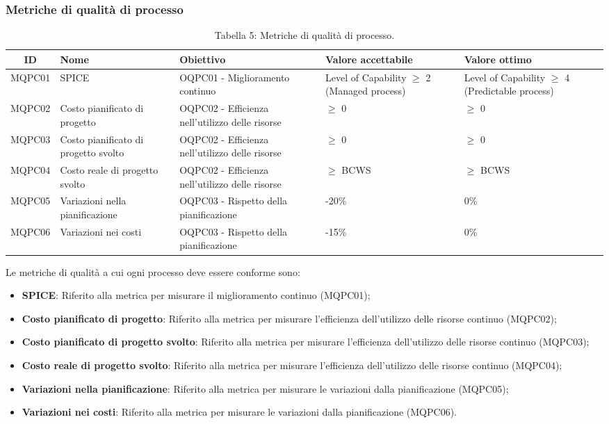 \subsubsection{Metriche di qualità di processo}
\begin{table}[H]
	\centering
	\begin{tabularx}{\textwidth}{|c|X|X|X|X|}
		\hline
		\textbf{ID} & \textbf{Nome} & \textbf{Obiettivo} & \textbf{Valore accettabile} & \textbf{Valore ottimo}\\
		\hline
		MQPC01 & SPICE & OQPC01 - Miglioramento continuo & Level of Capability $\geq$ 2 (Managed process) & Level of Capability $\geq$ 4 (Predictable process) \\
		\hline
		MQPC02 & Costo pianificato di progetto & OQPC02 - Efficienza nell'utilizzo delle risorse & $\geq$ 0 & $\geq$ 0 \\
		\hline
		MQPC03 & Costo pianificato di progetto svolto & OQPC02 - Efficienza nell'utilizzo delle risorse & $\geq$ 0 & $\geq$ 0 \\
		\hline
		MQPC04 & Costo reale di progetto svolto & OQPC02 - Efficienza nell'utilizzo delle risorse & $\geq$ BCWS & $\geq$ BCWS \\
		\hline
		MQPC05 & Variazioni nella pianificazione & OQPC03 - Rispetto della pianificazione & -20\% & 0\% \\
		\hline
		MQPC06 & Variazioni nei costi & OQPC03 - Rispetto della pianificazione & -15\% & 0\% \\
		\hline
	\end{tabularx}
	\caption{Tabella 5: Metriche di qualità di processo.}
\end{table}
Le metriche di qualità a cui ogni processo deve essere conforme sono:
\begin{itemize}
	\item \textbf{SPICE}: Riferito alla metrica per misurare il miglioramento continuo (MQPC01);
	\item \textbf{Costo pianificato di progetto}: Riferito alla metrica per misurare l'efficienza dell'utilizzo delle risorse continuo (MQPC02);
	\item \textbf{Costo pianificato di progetto svolto}: Riferito alla metrica per misurare l'efficienza dell'utilizzo delle risorse continuo (MQPC03);
	\item \textbf{Costo reale di progetto svolto}: Riferito alla metrica per misurare l'efficienza dell'utilizzo delle risorse continuo (MQPC04);
	\item \textbf{Variazioni nella pianificazione}: Riferito alla metrica per misurare le variazioni dalla pianificazione (MQPC05);
	\item \textbf{Variazioni nei costi}: Riferito alla metrica per misurare le variazioni dalla pianificazione (MQPC06).
\end{itemize}

